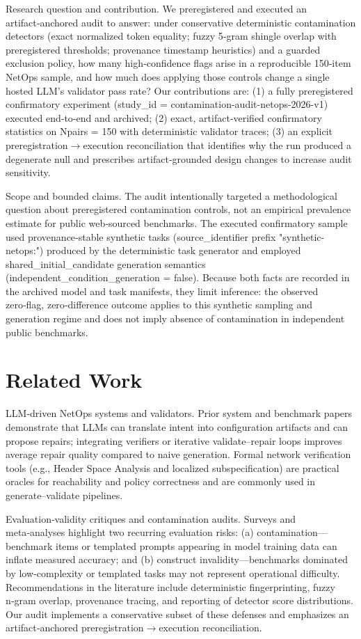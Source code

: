 \documentclass[conference]{IEEEtran}
\begin{document}
Research question and contribution. We preregistered and executed an artifact‑anchored audit to answer: under conservative deterministic contamination detectors (exact normalized token equality; fuzzy 5‑gram shingle overlap with preregistered thresholds; provenance timestamp heuristics) and a guarded exclusion policy, how many high‑confidence flags arise in a reproducible 150‑item NetOps sample, and how much does applying those controls change a single hosted LLM's validator pass rate? Our contributions are: (1) a fully preregistered confirmatory experiment (study\_id = contamination-audit-netops-2026-v1) executed end‑to‑end and archived; (2) exact, artifact‑verified confirmatory statistics on Npairs = 150 with deterministic validator traces; (3) an explicit preregistration\ensuremath{\rightarrow}execution reconciliation that identifies why the run produced a degenerate null and prescribes artifact‑grounded design changes to increase audit sensitivity.

Scope and bounded claims. The audit intentionally targeted a methodological question about preregistered contamination controls, not an empirical prevalence estimate for public web‑sourced benchmarks. The executed confirmatory sample used provenance‑stable synthetic tasks (source\_identifier prefix "synthetic-netops:") produced by the deterministic task generator and employed shared\_initial\_candidate generation semantics (independent\_condition\_generation = false). Because both facts are recorded in the archived model and task manifests, they limit inference: the observed zero‑flag, zero‑difference outcome applies to this synthetic sampling and generation regime and does not imply absence of contamination in independent public benchmarks.

\section{Related Work}
LLM‑driven NetOps systems and validators. Prior system and benchmark papers demonstrate that LLMs can translate intent into configuration artifacts and can propose repairs; integrating verifiers or iterative validate--repair loops improves average repair quality compared to naive generation. Formal network verification tools (e.g., Header Space Analysis and localized subspecification) are practical oracles for reachability and policy correctness and are commonly used in generate--validate pipelines.

Evaluation‑validity critiques and contamination audits. Surveys and meta‑analyses highlight two recurring evaluation risks: (a) contamination---benchmark items or templated prompts appearing in model training data can inflate measured accuracy; and (b) construct invalidity---benchmarks dominated by low‑complexity or templated tasks may not represent operational difficulty. Recommendations in the literature include deterministic fingerprinting, fuzzy n‑gram overlap, provenance tracing, and reporting of detector score distributions. Our audit implements a conservative subset of these defenses and emphasizes an artifact‑anchored preregistration\ensuremath{\rightarrow}execution reconciliation.
\end{document}

